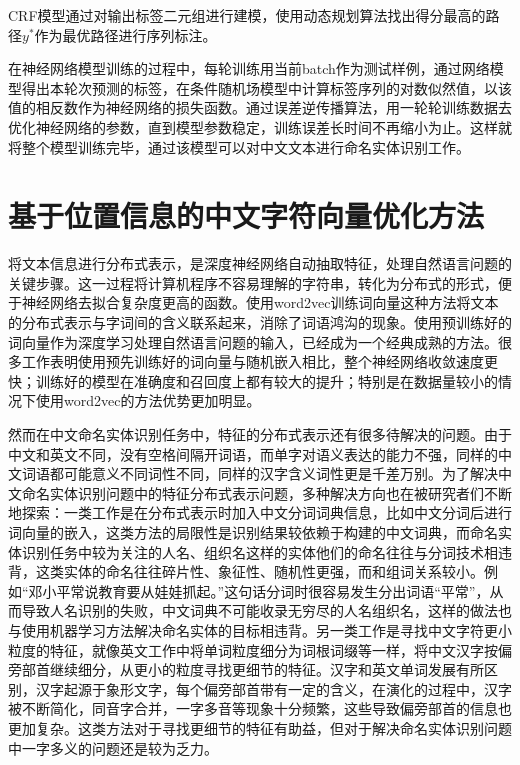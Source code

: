 \documentclass[winfonts,master,oneside,nobackinfo]{njuthesis}
\begin{document}
CRF模型通过对输出标签二元组进行建模，使用动态规划算法找出得分最高的路径$y^{*}$作为最优路径进行序列标注。

在神经网络模型训练的过程中，每轮训练用当前batch作为测试样例，通过网络模型得出本轮次预测的标签，在条件随机场模型中计算标签序列的对数似然值，以该值的相反数作为神经网络的损失函数。通过误差逆传播算法，用一轮轮训练数据去优化神经网络的参数，直到模型参数稳定，训练误差长时间不再缩小为止。这样就将整个模型训练完毕，通过该模型可以对中文文本进行命名实体识别工作。



\section{基于位置信息的中文字符向量优化方法}

将文本信息进行分布式表示，是深度神经网络自动抽取特征，处理自然语言问题的关键步骤。这一过程将计算机程序不容易理解的字符串，转化为分布式的形式，便于神经网络去拟合复杂度更高的函数。使用word2vec训练词向量这种方法将文本的分布式表示与字词间的含义联系起来，消除了词语鸿沟的现象。使用预训练好的词向量作为深度学习处理自然语言问题的输入，已经成为一个经典成熟的方法。很多工作表明\cite{Yoon}使用预先训练好的词向量与随机嵌入相比，整个神经网络收敛速度更快；训练好的模型在准确度和召回度上都有较大的提升；特别是在数据量较小的情况下使用word2vec的方法优势更加明显。

然而在中文命名实体识别任务中，特征的分布式表示还有很多待解决的问题。由于中文和英文不同，没有空格间隔开词语，而单字对语义表达的能力不强，同样的中文词语都可能意义不同词性不同，同样的汉字含义词性更是千差万别。为了解决中文命名实体识别问题中的特征分布式表示问题，多种解决方向也在被研究者们不断地探索：一类工作是在分布式表示时加入中文分词词典信息，比如中文分词后进行词向量的嵌入，这类方法的局限性是识别结果较依赖于构建的中文词典，而命名实体识别任务中较为关注的人名、组织名这样的实体他们的命名往往与分词技术相违背，这类实体的命名往往碎片性、象征性、随机性更强，而和组词关系较小。例如“邓小平常说教育要从娃娃抓起。”这句话分词时很容易发生分出词语“平常”，从而导致人名识别的失败，中文词典不可能收录无穷尽的人名组织名，这样的做法也与使用机器学习方法解决命名实体的目标相违背。另一类工作是寻找中文字符更小粒度的特征，就像英文工作中将单词粒度细分为词根词缀等一样，将中文汉字按偏旁部首继续细分，从更小的粒度寻找更细节的特征。汉字和英文单词发展有所区别，汉字起源于象形文字，每个偏旁部首带有一定的含义，在演化的过程中，汉字被不断简化，同音字合并，一字多音等现象十分频繁，这些导致偏旁部首的信息也更加复杂。这类方法对于寻找更细节的特征有助益，但对于解决命名实体识别问题中一字多义的问题还是较为乏力。
\end{document}
